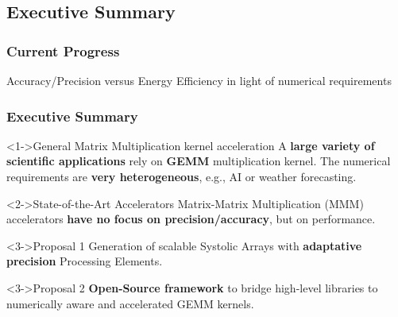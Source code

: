 \graphicspath{{../../../PhD/paper_factory/thesis_louis/Chapter4/Figs/}{../../../PhD/paper_factory/thesis_louis/Chapter3/Figs/}}
\subsection{Executive Summary}
\begin{frame}
    \frametitle{Current Progress}

    \centering
    \huge Accuracy/Precision versus Energy Efficiency in light of numerical requirements
    \normalsize

    \vspace{1em} %

    \tableofcontents[currentsection,
                     subsectionstyle=show/shaded/hide,
                     sectionstyle=show/hide]

\end{frame}

\begin{frame}
    \frametitle{Executive Summary}
        \begin{alertblock}<1->{General Matrix Multiplication kernel acceleration}
		A \textbf{large variety of scientific applications} rely on \textbf{GEMM} multiplication kernel. The numerical requirements are \textbf{very heterogeneous}, e.g., AI or weather forecasting.
        \end{alertblock}

        \begin{exampleblock}<2->{State-of-the-Art Accelerators}
		Matrix-Matrix Multiplication (MMM) accelerators \textbf{have no focus on precision/accuracy}, but on performance.
        \end{exampleblock}

        \begin{block}<3->{Proposal 1}
		Generation of scalable Systolic Arrays with \textbf{adaptative precision} Processing Elements.
        \end{block}
        \begin{block}<3->{Proposal 2}
		\textbf{Open-Source framework} to bridge high-level libraries to numerically aware and accelerated GEMM kernels.
        \end{block}
\end{frame}


